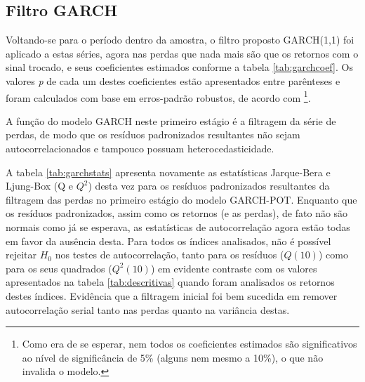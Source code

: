\documentclass[1p]{elsarticle}
\theoremstyle{definition}
\begin{document}
\subsection{Filtro GARCH}
\label{sec:filtro}

Voltando-se para o período dentro da amostra, o filtro proposto GARCH(1,1) foi aplicado a estas séries, agora nas perdas que nada mais são que os retornos com o sinal trocado, e seus coeficientes estimados conforme a tabela \ref{tab:garchcoef}. Os valores \emph{p} de cada um destes coeficientes estão apresentados entre parênteses e foram calculados com base em erros-padrão robustos, de acordo com \cite{White1982}\footnote{Como era de se esperar, nem todos os coeficientes estimados são significativos ao nível de significância de 5\% (alguns nem mesmo a 10\%), o que não invalida o modelo.}.

A função do modelo GARCH neste primeiro estágio é a filtragem da série de perdas, de modo que os resíduos padronizados resultantes não sejam autocorrelacionados e tampouco possuam heterocedasticidade. %




A tabela \ref{tab:garchstats} apresenta novamente as estatísticas Jarque-Bera e Ljung-Box (Q e $Q^2$) desta vez para os resíduos padronizados resultantes da filtragem das perdas no primeiro estágio do modelo GARCH-POT. Enquanto que os resíduos padronizados, assim como os retornos (e as perdas), de fato não são normais como já se esperava, as estatísticas de autocorrelação agora estão todas em favor da ausência desta. Para todos os índices analisados, não é possível rejeitar $H_0$ nos testes de autocorrelação, tanto para os resíduos ($Q(10)$) como para os seus quadrados ($Q^2(10)$) em evidente contraste com os valores apresentados na tabela \ref{tab:descritivas} quando foram analisados os retornos destes índices. Evidência que a filtragem inicial foi bem sucedida em remover autocorrelação serial tanto nas perdas quanto na variância destas.
\end{document}
